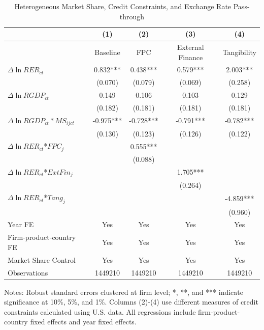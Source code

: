 \begin{table}[htb]
	\centering
	\caption{Heterogeneous Market Share, Credit Constraints, and Exchange Rate Pass-through}
	\begin{threeparttable}
		\begin{tabular}{lcccc}
			\toprule
			& (1)   & (2)   & (3)   & (4) \\
			\midrule
			&  Baseline     & FPC & External Finance& Tangibility        \\
			\midrule
			$\Delta \ln RER_{ct}$ & 0.832*** & 0.438*** & 0.579*** & 2.003*** \\
			& (0.070) & (0.079) & (0.069) & (0.258) \\
			$\Delta \ln RGDP_{ct}$ & 0.149 & 0.106 & 0.103 & 0.129 \\
			& (0.182) & (0.181) & (0.181) & (0.181) \\
			$\Delta \ln RGDP_{ct}*MS_{ijct}$ & -0.975*** & -0.728*** & -0.791*** & -0.782*** \\
			& (0.130) & (0.123) & (0.126) & (0.122) \\
			$\Delta \ln RER_{ct}$*$FPC_{j}$ &  & 0.555*** &       &  \\
			&  & (0.088) &       &  \\
			$\Delta \ln RER_{ct}$*$ExtFin_{j}$ &   &       & 1.705*** &  \\
			&  &       & (0.264) &  \\
			$\Delta \ln RER_{ct}$*$Tang_{j}$ &   &       &       & -4.859*** \\
			&   &       &       & (0.960) \\
			Year FE  & Yes  & Yes   & Yes   & Yes \\
			Firm-product-country FE & Yes    & Yes   & Yes   & Yes \\
			Market Share Control & Yes   & Yes   & Yes   & Yes \\
			Observations & 1449210  & 1449210 & 1449210 & 1449210 \\
			\bottomrule
		\end{tabular}
		\begin{tablenotes}
			\footnotesize
			\item[Notes:] Robust standard errors clustered at firm level; *, **, and *** indicate significance at 10\%, 5\%, and 1\%. Columns (2)-(4) use different measures of credit constraints calculated using U.S. data. All regressions include firm-product-country fixed effects and year fixed effects.
		\end{tablenotes}
	\end{threeparttable}
	\label{tab.share}
\end{table}

